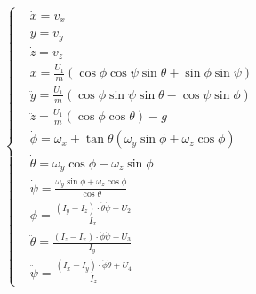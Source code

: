 \documentclass[lang=chs, degree=master, blindreview=false, winfonts=true]{yanputhesis}
\begin{document}
\begin{equation}
		\left\{
	\begin{aligned}
		&\dot{x}=v_{x}\\
		&\dot{y}=v_{y}\\
		&\dot{z}=v_{z}\\
		&\ddot{x}=\frac{U_{1}}{m}\left(\cos\phi\cos\psi\sin\theta+\sin\phi\sin\psi\right)\\
		&\ddot{y}=\frac{U_{1}}{m}\left(\cos\phi\sin\psi\sin\theta-\cos\psi\sin\phi\right)\\
		&\ddot{z}=\frac{U_{1}}{m}\left(\cos\phi\cos\theta\right)-g\\
		&\dot{\phi}={\omega}_x+\tan\theta\left({\omega}_y\sin\phi+{\omega}_z\cos\phi\right)\\
		&\dot{\theta}={\omega}_y\cos\phi-{\omega}_z\sin\phi\\
		&\dot{\psi}=\frac{{\omega}_y\sin\phi+{\omega}_z\cos\phi}{\cos\theta}\\
		&\ddot{\phi}=\frac{(I_{y}-I_{z})\cdot \dot{\theta}\dot{\psi}+U_{2}}{I_{x}}\\
		&\ddot{\theta}=\frac{(I_{z}-I_{x})\cdot \dot{\phi}\dot{\psi}+U_{3}}{I_{y}}\\
		&\ddot{\psi}=\frac{(I_{x}-I_{y})\cdot \dot{\phi}\dot{\theta}+U_{4}}{I_{z}}\end{aligned}
	\right.
	\label{2-7}
\end{equation}
\end{document}
